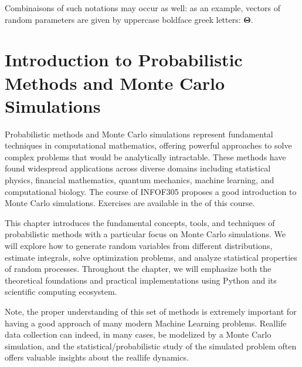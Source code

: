 \documentclass[letterpaper,10pt,english]{jupyterBook}
\begin{document}
\sphinxAtStartPar
Combinaisons of such notations may occur as well: as an example, vectors of random parameters are given by uppercase boldface greek letters: \(\mathbf \Theta\).

\sphinxstepscope


\chapter{Introduction to Probabilistic Methods and Monte Carlo Simulations}
\label{\detokenize{01:introduction-to-probabilistic-methods-and-monte-carlo-simulations}}\label{\detokenize{01::doc}}
\sphinxAtStartPar
Probabilistic methods and Monte Carlo simulations represent fundamental techniques in computational mathematics, offering powerful approaches to solve complex problems that would be analytically intractable. These methods have found widespread applications across diverse domains including statistical physics, financial mathematics, quantum mechanics, machine learning, and computational biology. The course of INFO\sphinxhyphen{}F305 \sphinxhyphen{}  proposes a good introduction to Monte Carlo simulations. Exercises are available in the  of this course.

\sphinxAtStartPar
This chapter introduces the fundamental concepts, tools, and techniques of probabilistic methods with a particular focus on Monte Carlo simulations. We will explore how to generate random variables from different distributions, estimate integrals, solve optimization problems, and analyze statistical properties of random processes. Throughout the chapter, we will emphasize both the theoretical foundations and practical implementations using Python and its scientific computing ecosystem.

\sphinxAtStartPar
Note, the proper understanding of this set of methods is extremely important for having a good approach of many modern Machine Learning problems. Real\sphinxhyphen{}life data collection can indeed, in many cases, be modelized by a Monte Carlo simulation, and the statistical/probabilistic study of the simulated problem often offers valuable insights about the real\sphinxhyphen{}life dynamics.
\end{document}
